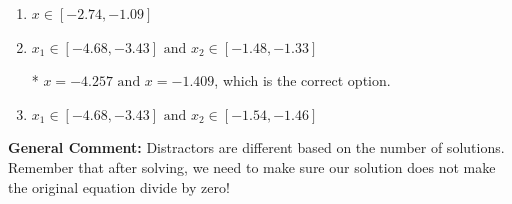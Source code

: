 \documentclass{extbook}[14pt]
\begin{document}
\begin{enumerate}
{\begin{enumerate}[label=\Alph*.]
\item \( x \in [-2.74,-1.09] \)


\item \( x_1 \in [-4.68, -3.43] \text{ and } x_2 \in [-1.48,-1.33] \)

* $x = -4.257 \text{ and } x = -1.409$, which is the correct option.
\item \( x_1 \in [-4.68, -3.43] \text{ and } x_2 \in [-1.54,-1.46] \)


\end{enumerate}

\textbf{General Comment:} Distractors are different based on the number of solutions. Remember that after solving, we need to make sure our solution does not make the original equation divide by zero!
}
\end{enumerate}
\end{document}
